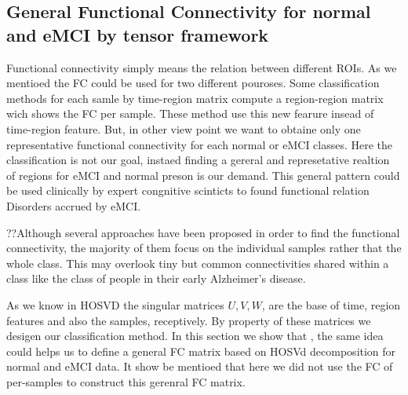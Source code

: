 \documentclass[journal]{IEEEtran}
\begin{document}
{	\subsection{General Functional Connectivity for normal and eMCI by tensor framework} \label{FC_Construction}
	
	
	Functional connectivity simply means the relation between different ROIs. As we mentioed the FC could be used for two different pouroses. Some classification methods for each samle by time-region matrix compute a region-region matrix wich shows the FC per sample. These method use this new fearure insead of time-region feature.  But, in other view point we want to obtaine only one representative functional connectivity for each normal or eMCI classes. Here the classification is not our goal, instaed  finding a gereral and represetative
	realtion of regions for eMCI and normal preson is our demand. This general pattern could be used clinically by expert congnitive scinticts to found  
	functional relation Disorders accrued by eMCI.
	
	
	
	
	
	
	{\color{blue}
		??Although several approaches have been proposed in order to find the functional connectivity, the majority of them focus on the individual samples rather that the whole class. This may overlook tiny but common connectivities shared within a class like the class of people in their early Alzheimer's disease.  
	}
	
	
	As we know in HOSVD  the singular matrices $U,V,W$, are the base of time, region features and also the samples, receptively. By property of these matrices we desigen our classification method. In this section we show that
	, the same idea could helps us to define a general FC matrix based on HOSVd decomposition for normal and
	eMCI data. It show be mentioed that here we did not use the FC of per-samples to construct this gerenral FC matrix.
	
}
\end{document}
